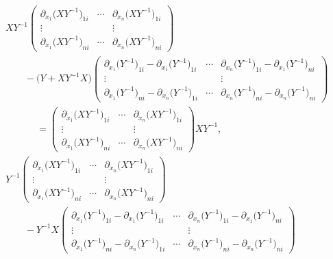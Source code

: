 \documentclass[10pt,a4paper]{amsart}
\numberwithin{equation}{section}
\begin{document}
\begin{align}
& XY^{-1}
\begin{pmatrix}
\partial_{x_1}\bigl(XY^{-1}\bigr)_{1i} & \cdots & \partial_{x_n}\bigl(XY^{-1}\bigr)_{1i} \\
\vdots & & \vdots \\
\partial_{x_1}\bigl(XY^{-1}\bigr)_{ni} & \cdots & \partial_{x_n}\bigl(XY^{-1}\bigr)_{ni}
\end{pmatrix} \nonumber \\
&\qquad-\bigl(Y+XY^{-1}X\bigr)
\begin{pmatrix}
\partial_{x_1}\bigl(Y^{-1}\bigr)_{1i}-\partial_{x_1}\bigl(Y^{-1}\bigr)_{1i} & \cdots & \partial_{x_n}\bigl(Y^{-1}\bigr)_{1i}-\partial_{x_1}\bigl(Y^{-1}\bigr)_{ni} \\
\vdots & & \vdots \\
\partial_{x_1}\bigl(Y^{-1}\bigr)_{ni}-\partial_{x_n}\bigl(Y^{-1}\bigr)_{1i} & \cdots & \partial_{x_n}\bigl(Y^{-1}\bigr)_{ni}-\partial_{x_n}\bigl(Y^{-1}\bigr)_{ni}
\end{pmatrix}\nonumber \\
&\phantom{\qquad-}{}=
\begin{pmatrix}
\partial_{x_1}\bigl(XY^{-1}\bigr)_{1i} & \cdots & \partial_{x_n}\bigl(XY^{-1}\bigr)_{1i} \\
\vdots & & \vdots \\
\partial_{x_1}\bigl(XY^{-1}\bigr)_{ni} & \cdots & \partial_{x_n}\bigl(XY^{-1}\bigr)_{ni}
\end{pmatrix}XY^{-1},\label{K1}
\\
& Y^{-1}
\begin{pmatrix}
\partial_{x_1}\bigl(XY^{-1}\bigr)_{1i} & \cdots & \partial_{x_n}\bigl(XY^{-1}\bigr)_{1i} \\
\vdots & & \vdots \\
\partial_{x_1}\bigl(XY^{-1}\bigr)_{ni} & \cdots & \partial_{x_n}\bigl(XY^{-1}\bigr)_{ni}
\end{pmatrix}\nonumber \\
&\qquad-Y^{-1}X
\begin{pmatrix}
\partial_{x_1}\bigl(Y^{-1}\bigr)_{1i}-\partial_{x_1}\bigl(Y^{-1}\bigr)_{1i} & \cdots & \partial_{x_n}\bigl(Y^{-1}\bigr)_{1i}-\partial_{x_1}\bigl(Y^{-1}\bigr)_{ni} \\
\vdots & & \vdots \\
\partial_{x_1}\bigl(Y^{-1}\bigr)_{ni}-\partial_{x_n}\bigl(Y^{-1}\bigr)_{1i} & \cdots & \partial_{x_n}\bigl(Y^{-1}\bigr)_{ni}-\partial_{x_n}\bigl(Y^{-1}\bigr)_{ni}
\end{pmatrix}\nonumber \\

\end{align}
\end{document}

